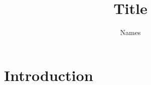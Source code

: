 \documentclass[cover]{ams-project}
\title{Title}
\author{Names}
\begin{document}
\maketitle

\begin{abstract}
\Blindtext
\end{abstract}

\clearpage
\tableofcontents
\cleardoublepage

\section[Introduction]{Introduction}
\Blindtext
\cite{RaspiPower}


\end{document}
